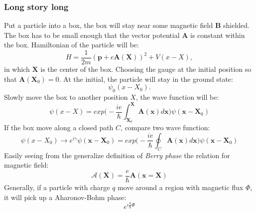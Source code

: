 \documentclass[unnumsec,webpdf,modern,large]{mam-authoring-template}%
\theoremstyle{thmstyleone}%
\theoremstyle{thmstyletwo}%
\theoremstyle{thmstylethree}%
\begin{document}
\begin{appendices}
\subsubsection{Long story long}
\quad Put a particle into a box, the box will stay near some magnetic field \(\textbf{B}\) shielded. The box has to be small enough that the vector potential \(\textbf{A}\) is constant within the box. Hamiltonian of the particle will be:
\begin{equation}
	H = \frac{1}{2m} (\textbf{p} + e\textbf{A}(\textbf{X}))^2 + V(x-X),
\end{equation}
in which \(\textbf{X}\) is the center of the box. Choosing the gauge at the initial position so that \(\textbf{A}(\textbf{X}_0) = 0\). At the initial, the particle will stay in the ground state:
$$\psi_0(x-X_0).$$
\quad Slowly move the box to another position \(X\), the wave function will be:
$$\psi(x-X) = exp\bigg(-\frac{ie}{\hbar} \int_{\textbf{X}_0}^{\textbf{X}} \textbf{A}(\textbf{x}) d\textbf{x}\bigg) \psi(\textbf{x}-\textbf{X}_0)$$
\quad If the box move along a closed path \(C\), compare two wave function:
$$\psi(x-X_0) \to e^{i\gamma} \psi(\textbf{x} - \textbf{X}_0)=exp\bigg(-\frac{ie}{\hbar} \oint_C \textbf{A}(\textbf{x}) d\textbf{x}\bigg) \psi(\textbf{x}-\textbf{X}_0)$$
\quad Easily seeing from the generalize definition of \textit{Berry phase} the relation for magnetic field:
$$\bm{\mathcal{A}}(\textbf{X}) = \frac{e}{\hbar} \textbf{A}(\textbf{x}= \textbf{X})$$
\quad Generally, if a particle with charge \(q\) move around a region with magnetic flux \(\Phi\), it will pick up a Aharonov-Bohm phase:
\begin{equation} \label{AB phase}
	e^{i\frac{q}{\hbar} \Phi}
\end{equation}

\end{appendices}
\end{document}
